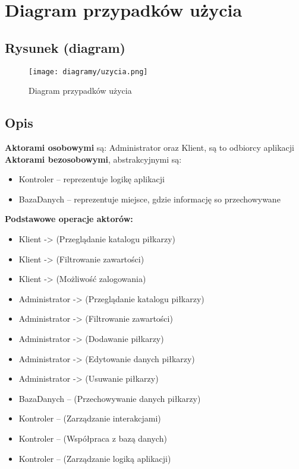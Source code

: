 \section{Diagram przypadków użycia}
    \subsection{Rysunek (diagram)}

    \begin{figure}[!htb]
        \centering
        \texttt{[image: diagramy/uzycia.png]}
        \caption{Diagram przypadków użycia}
    \end{figure}

    \subsection{Opis}


        \textbf{Aktorami osobowymi} są: Administrator oraz Klient, są to odbiorcy aplikacji\\
        \textbf{Aktorami bezosobowymi}, abstrakcyjnymi są:
        \begin{itemize}
            \item Kontroler – reprezentuje logikę aplikacji
            \item BazaDanych – reprezentuje miejsce, gdzie informację so przechowywane
        \end{itemize}

        \textbf{Podstawowe operacje aktorów:}
        \begin{itemize}
            \item Klient -> (Przeglądanie katalogu piłkarzy)
            \item Klient -> (Filtrowanie zawartości)
            \item Klient -> (Możliwość zalogowania)
            \item Administrator -> (Przeglądanie katalogu piłkarzy)
            \item Administrator -> (Filtrowanie zawartości)
            \item Administrator -> (Dodawanie piłkarzy)
            \item Administrator -> (Edytowanie danych piłkarzy)
            \item Administrator -> (Usuwanie piłkarzy)
            \item BazaDanych -- (Przechowywanie danych piłkarzy)
            \item Kontroler -- (Zarządzanie interakcjami)
            \item Kontroler -- (Współpraca z bazą danych)
            \item Kontroler -- (Zarządzanie logiką aplikacji)
        \end{itemize}

        
        
       
       
        
        
        
        
       
        
        
        